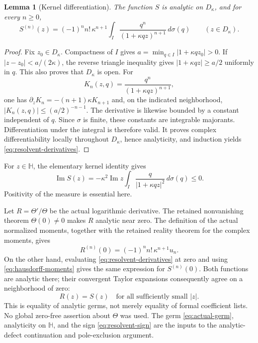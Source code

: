 \documentclass[11pt,a4paper]{article}
\newtheorem{lemma}[theorem]{Lemma}
\theoremstyle{definition}
\numberwithin{equation}{section}
\begin{document}
\begin{lemma}[Kernel differentiation]\label{lem:resolvent-derivatives}
The function $S$ is analytic on $D_\kappa$, and for every $n\geq0$,
\begin{equation}\label{eq:resolvent-derivatives}
 S^{(n)}(z)=(-1)^n n!\,\kappa^{n+1}
 \int_I\frac{q^n}{(1+\kappa qz)^{n+1}}\,d\sigma(q)
 \qquad(z\in D_\kappa).
\end{equation}
\end{lemma}
\begin{proof}
Fix $z_0\in D_\kappa$.  Compactness of $I$ gives
$a=\min_{q\in I}|1+\kappa qz_0|>0$.  If
$|z-z_0|<a/(2\kappa)$, the reverse triangle inequality gives
$|1+\kappa qz|\geq a/2$ uniformly in $q$.  This also proves that
$D_\kappa$ is open.  For
\[
 K_n(z,q)=\frac{q^n}{(1+\kappa qz)^{n+1}},
\]
one has $\partial_z K_n=-(n+1)\kappa K_{n+1}$ and, on the indicated
neighborhood, $|K_n(z,q)|\leq(a/2)^{-n-1}$.  The derivative is likewise
bounded by a constant independent of $q$.  Since $\sigma$ is finite,
these constants are integrable majorants.  Differentiation under the
integral is therefore valid.  It proves complex differentiability locally
throughout $D_\kappa$, hence analyticity, and induction yields
\eqref{eq:resolvent-derivatives}.
\end{proof}

For $z\in\mathbb H$, the elementary kernel identity gives
\begin{equation}\label{eq:resolvent-sign}
 \operatorname{Im}S(z)
 =-\kappa^2\operatorname{Im}z
   \int_I\frac{q}{|1+\kappa qz|^2}\,d\sigma(q)\leq0.
\end{equation}
Positivity of the measure is essential here.

Let $R=\Theta'/\Theta$ be the actual logarithmic derivative.  The
retained nonvanishing theorem $\Theta(0)\ne0$ makes $R$ analytic near
zero.  The definition of the actual normalized moments, together with
the retained reality theorem for the complex moments, gives
\[
 R^{(n)}(0)=(-1)^n n!\,\kappa^{n+1}u_n.
\]
On the other hand, evaluating \eqref{eq:resolvent-derivatives} at zero
and using \eqref{eq:hausdorff-moments} gives the same expression for
$S^{(n)}(0)$.  Both functions are analytic there; their convergent Taylor
expansions consequently agree on a neighborhood of zero:
\begin{equation}\label{eq:actual-germ}
 R(z)=S(z)\quad\text{for all sufficiently small }|z|.
\end{equation}
This is equality of analytic germs, not merely equality of formal
coefficient lists.  No global zero-free assertion about $\Theta$ was
used.  The germ \eqref{eq:actual-germ}, analyticity on $\mathbb H$, and
the sign \eqref{eq:resolvent-sign} are the inputs to the analytic-defect
continuation and pole-exclusion argument.
\end{document}
